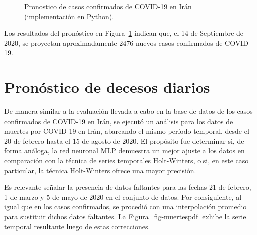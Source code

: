 \documentclass[
  us-letterpaper,
]{scrreprt}
\theoremstyle{plain}
\theoremstyle{definition}
\theoremstyle{definition}
\theoremstyle{plain}
\theoremstyle{remark}
\begin{document}
\begin{figure}


\caption{\label{fig-mlp1}Pronostico de casos confirmados de COVID-19 en
Irán (implementación en Python).}

\end{figure}%

Los resultados del pronóstico en Figura~\ref{fig-mlp1} indican que, el
14 de Septiembre de 2020, se proyectan aproximadamente 2476 nuevos casos
confirmados de COVID-19.

\chapter{Pronóstico de decesos
diarios}\label{pronuxf3stico-de-decesos-diarios}

De manera similar a la evaluación llevada a cabo en la base de datos de
los casos confirmados de COVID-19 en Irán, se ejecutó un análisis para
los datos de muertes por COVID-19 en Irán, abarcando el mismo período
temporal, desde el 20 de febrero hasta el 15 de agosto de 2020. El
propósito fue determinar si, de forma análoga, la red neuronal MLP
demuestra un mejor ajuste a los datos en comparación con la técnica de
series temporales Holt-Winters, o si, en este caso particular, la
técnica Holt-Winters ofrece una mayor precisión.

Es relevante señalar la presencia de datos faltantes para las fechas 21
de febrero, 1 de marzo y 5 de mayo de 2020 en el conjunto de datos. Por
consiguiente, al igual que en los casos confirmados, se procedió con una
interpolación promedio para sustituir dichos datos faltantes. La
Figura~\ref{fig-muertespdf} exhibe la serie temporal resultante luego de
estas correcciones.
\end{document}
